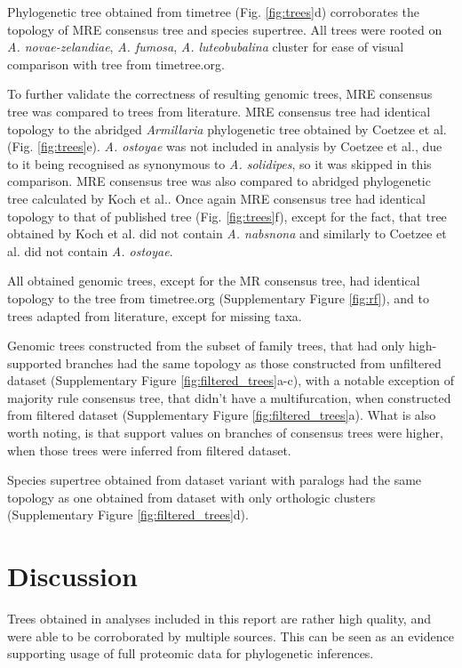 \documentclass[two column, twoside, a4paper]{article}
\begin{document}
Phylogenetic tree obtained from timetree\autocite{Kumar2017} (Fig. \ref{fig:trees}d) corroborates the topology of MRE consensus tree and species supertree. All trees were rooted on \textit{A. novae-zelandiae}, \textit{A. fumosa}, \textit{A. luteobubalina} cluster for ease of visual comparison with tree from timetree.org.

To further validate the correctness of resulting genomic trees, MRE consensus tree was compared to trees from literature. MRE consensus tree had identical topology to the abridged \textit{Armillaria} phylogenetic tree obtained by Coetzee et al.\autocite{Coetzee2011} (Fig. \ref{fig:trees}e). \textit{A. ostoyae} was not included in analysis by Coetzee et al., due to it being recognised as synonymous to \textit{A. solidipes}, so it was skipped in this comparison. MRE consensus tree was also compared to abridged phylogenetic tree calculated by Koch et al.\autocite{Koch2017}. Once again MRE consensus tree had identical topology to that of published tree (Fig. \ref{fig:trees}f), except for the fact, that tree obtained by Koch et al. did not contain \textit{A. nabsnona} and similarly to Coetzee et al. did not contain \textit{A. ostoyae}.

All obtained genomic trees, except for the MR consensus tree, had identical topology to the tree from timetree.org (Supplementary Figure \ref{fig:rf}), and to trees adapted from literature, except for missing taxa.

Genomic trees constructed from the subset of family trees, that had only high-supported branches had the same topology as those constructed from unfiltered dataset (Supplementary Figure \ref{fig:filtered_trees}a-c), with a notable exception of majority rule consensus tree, that didn't have a multifurcation, when constructed from filtered dataset (Supplementary Figure \ref{fig:filtered_trees}a). What is also worth noting, is that support values on branches of consensus trees were higher, when those trees were inferred from filtered dataset.

Species supertree obtained from dataset variant with paralogs had the same topology as one obtained from dataset with only orthologic clusters (Supplementary Figure \ref{fig:filtered_trees}d).

\section{Discussion}

Trees obtained in analyses included in this report are rather high quality, and were able to be corroborated by multiple sources. This can be seen as an evidence supporting usage of full proteomic data for phylogenetic inferences. 
\end{document}
